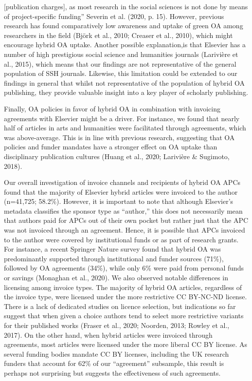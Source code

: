 \documentclass[a4paper,man,floatsintext,longtable,noextraspace,12pt]{apa6}
\begin{document}
{[}publication charges{]}, as most research in the social sciences is
not done by means of project-specific funding'' Severin et al. (2020, p.
15). However, previous research has found comparatively low awareness
and uptake of green OA among researchers in the field (Björk et al.,
2010; Creaser et al., 2010), which might encourage hybrid OA uptake.
Another possible explanation,is that Elsevier has a number of high
prestigious social science and humanities journals (Larivière et al.,
2015), which means that our findings are not representative of the
general population of SSH journals. Likewise, this limitation could be
extended to our findings in general that whilst not representative of
the population of hybrid OA publishing, they provide valuable insight
into a key player of scholarly publishing.

Finally, OA policies in favor of hybrid OA in combination with invoicing
agreements with Elsevier might be a driver. For instance, we found that
nearly half of articles in arts and humanities were facilitated through
agreements, which was above-average. This is in line with previous
research, suggesting that OA policies and funder mandates have a
stronger effect on OA uptake than disciplinary publication cultures
(Huang et al., 2020; Larivière \& Sugimoto, 2018).

Our overall investigation of invoice channels and recipients of hybrid
OA APCs found that the majority of Elsevier hybrid articles were
invoiced to the author (n=41,725; 58.2\%). However, it is important to
note that although Elsevier's metadata classifies the sponsor type as
``author,'' this does not necessarily mean that authors paid for APCs
out of their own pocket but rather just that the APC was not invoiced
through an agreement. Hence, it is possible that APCs invoiced to the
author were covered by institutional funds or as part of research
grants. For instance, a recent Springer Nature survey found that hybrid
OA was predominantly supported through institutional and funder sources
(71\%), followed by OA agreements (34\%), while only 6\% were paid from
personal funds or savings (Monaghan et al., 2020). We also observed
notable differences in licensing among invoice types. The majority of
hybrid OA articles, regardless of the invoice type, were licensed under
the more restrictive CC BY-NC-ND license. There is a lack of dedicated
studies on licence selection, but indications so far suggest that when
given a choice authors tend to select more restrictive variants for
their published works (Fraser et al., 2020; Noorden, 2013; Rowley et
al., 2017). On the other hand, when hybrid articles were invoiced
through agreements, most articles were licensed under the more liberal
CC BY license. As several funding bodies mandate CC BY licenses,
including the UK research funders that account for 62\% of our
``agreement'' subsample, this result is perhaps not surprising but
suggests the effectiveness of such agreements.
\end{document}
